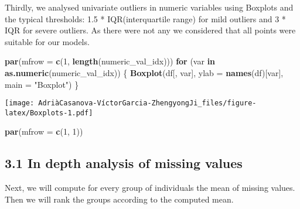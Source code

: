 \documentclass[
]{article}
\newenvironment{Shaded}{\begin{snugshade}}{\end{snugshade}}
\newcommand{\AttributeTok}[1]{\textcolor[rgb]{0.13,0.29,0.53}{#1}}
\newcommand{\ControlFlowTok}[1]{\textcolor[rgb]{0.13,0.29,0.53}{\textbf{#1}}}
\newcommand{\DecValTok}[1]{\textcolor[rgb]{0.00,0.00,0.81}{#1}}
\newcommand{\FunctionTok}[1]{\textcolor[rgb]{0.13,0.29,0.53}{\textbf{#1}}}
\newcommand{\NormalTok}[1]{#1}
\newcommand{\StringTok}[1]{\textcolor[rgb]{0.31,0.60,0.02}{#1}}
\begin{document}
Thirdly, we analysed univariate outliers in numeric variables using
Boxplots and the typical thresholds: 1.5 * IQR(interquartile range) for
mild outliers and 3 * IQR for severe outliers. As there were not any we
considered that all points were suitable for our models.

\begin{Shaded}
\begin{Highlighting}[]
\FunctionTok{par}\NormalTok{(}\AttributeTok{mfrow =} \FunctionTok{c}\NormalTok{(}\DecValTok{1}\NormalTok{, }\FunctionTok{length}\NormalTok{(numeric\_val\_idx)))}
\ControlFlowTok{for}\NormalTok{ (var }\ControlFlowTok{in} \FunctionTok{as.numeric}\NormalTok{(numeric\_val\_idx)) \{}
    \FunctionTok{Boxplot}\NormalTok{(df[, var], }\AttributeTok{ylab =} \FunctionTok{names}\NormalTok{(df)[var], }\AttributeTok{main =} \StringTok{"Boxplot"}\NormalTok{)}
\NormalTok{\}}
\end{Highlighting}
\end{Shaded}

\texttt{[image: AdriàCasanova-VíctorGarcia-ZhengyongJi\_files/figure-latex/Boxplots-1.pdf]}

\begin{Shaded}
\begin{Highlighting}[]
\FunctionTok{par}\NormalTok{(}\AttributeTok{mfrow =} \FunctionTok{c}\NormalTok{(}\DecValTok{1}\NormalTok{, }\DecValTok{1}\NormalTok{))}
\end{Highlighting}
\end{Shaded}

\hypertarget{in-depth-analysis-of-missing-values}{%
\subsection{3.1 In depth analysis of missing
values}\label{in-depth-analysis-of-missing-values}}

Next, we will compute for every group of individuals the mean of missing
values. Then we will rank the groups according to the computed mean.
\end{document}
